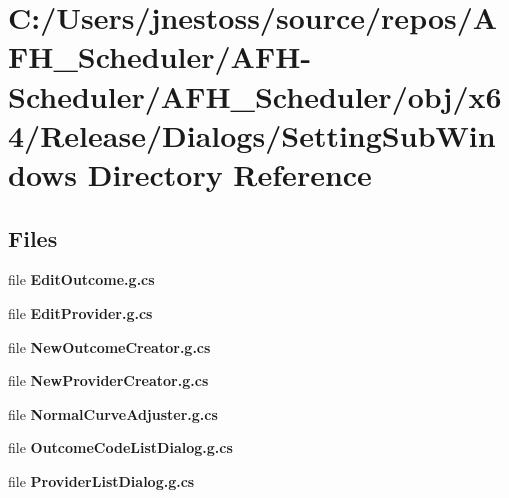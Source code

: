 \section{C\+:/\+Users/jnestoss/source/repos/\+A\+F\+H\+\_\+\+Scheduler/\+A\+F\+H-\/\+Scheduler/\+A\+F\+H\+\_\+\+Scheduler/obj/x64/\+Release/\+Dialogs/\+Setting\+Sub\+Windows Directory Reference}
\label{dir_349ebcdf5facf82c5ddcb6d760307bf1}
\subsection*{Files}
\begin{DoxyCompactItemize}
\item 
file \textbf{ Edit\+Outcome.\+g.\+cs}
\item 
file \textbf{ Edit\+Provider.\+g.\+cs}
\item 
file \textbf{ New\+Outcome\+Creator.\+g.\+cs}
\item 
file \textbf{ New\+Provider\+Creator.\+g.\+cs}
\item 
file \textbf{ Normal\+Curve\+Adjuster.\+g.\+cs}
\item 
file \textbf{ Outcome\+Code\+List\+Dialog.\+g.\+cs}
\item 
file \textbf{ Provider\+List\+Dialog.\+g.\+cs}
\end{DoxyCompactItemize}
